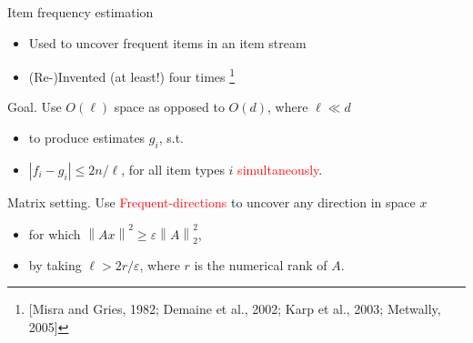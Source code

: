 \documentclass[first=dgreen,second=purple,logo=redque]{aaltoslides}
\newcommand{\vectornorm}[1]{\left\|#1\right\|}
\begin{document}
\begin{frame}[allowframebreaks=1]{Item frequency estimation}
\begin{itemize}
    \item Used to uncover \textcolor{dgreen}{frequent} items in an item stream
    \item (Re-)Invented (at least!) four times \cite{Misra82, Demaine02, Karp03, Metwally05}\footnote{[Misra and Gries, 1982; Demaine et al., 2002; Karp et al., 2003; Metwally, 2005]}
\end{itemize}

\textcolor{dgreen}{Goal.} Use $O(\ell)$ space as opposed to $O(d)$, where $\ell \ll d$
\begin{itemize}
	\item to produce estimates $g_{i}$, s.t.
	\item $|f_{i} - g_{i} | \leq 2n/\ell$, for all item types $i$ \textcolor{red}{simultaneously}.
\end{itemize}

\textcolor{dgreen}{Matrix setting.} Use \textcolor{red}{Frequent-directions} to uncover any direction in space $x$
\begin{itemize}
	\item for which $\vectornorm{Ax}^{2} \geq \varepsilon \vectornorm{A}_{2}^{2}$,
	\item by taking $\ell > 2r/\varepsilon$, where $r$ is the \textcolor{dgreen}{numerical rank} of $A$.
\end{itemize}

\end{frame}
\end{document}
